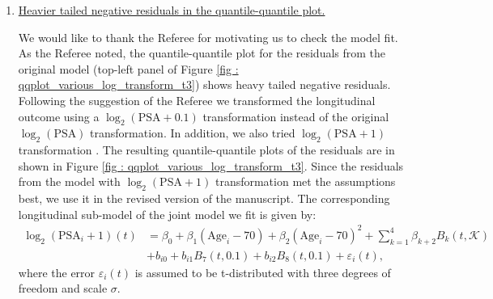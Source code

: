     \begin{enumerate}
        \item \underline{Heavier tailed negative residuals in the quantile-quantile plot.}

        We would like to thank the Referee for motivating us to check the model fit. As the Referee noted, the quantile-quantile plot for the residuals from the original model (top-left panel of Figure \ref{fig : qqplot_various_log_transform_t3}) shows heavy tailed negative residuals. Following the suggestion of the Referee we transformed the longitudinal outcome using a $\log_2 (\mbox{PSA}+0.1)$ transformation instead of the original $\log_2 (\mbox{PSA})$ transformation. In addition, we also tried $\log_2 (\mbox{PSA}+1)$ transformation \citep{lin2000latent,pearson1994mixed}. The resulting quantile-quantile plots of the residuals are in shown in Figure \ref{fig : qqplot_various_log_transform_t3}. Since the residuals from the model with $\log_2(\mbox{PSA} + 1)$ transformation met the assumptions best, we use it in the revised version of the manuscript. The corresponding longitudinal sub-model of the joint model we fit is given by:
        \begin{equation}
        \label{eq : long_model_prias_ref2}
        \begin{aligned}
    \log_2 (\mbox{PSA}_i + 1)(t) &= \beta_0 + \beta_1 (\mbox{Age}_i-70) + \beta_2 (\mbox{Age}_i-70)^2 + \sum_{k=1}^4 \beta_{k+2} B_k(t,\mathcal{K})\\ 
    &+  b_{i0} + b_{i1} B_7(t, 0.1) + b_{i2} B_8(t, 0.1) +
    \varepsilon_i(t),
    \end{aligned}
    \end{equation}
        where the error $\varepsilon_i(t)$ is assumed to be t-distributed with three degrees of freedom and scale $\sigma$.


\end{enumerate}
